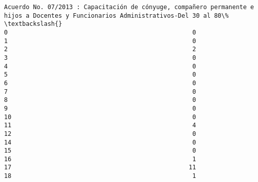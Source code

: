 \documentclass[11pt]{article}
\begin{document}
\begin{Verbatim}[commandchars=\\\{\}]
    Acuerdo No. 07/2013 : Capacitación de cónyuge, compañero permanente e hijos a Docentes y Funcionarios Administrativos-Del 30 al 80\%   \textbackslash{}
0                                                   0                                                                                      
1                                                   0                                                                                      
2                                                   2                                                                                      
3                                                   0                                                                                      
4                                                   0                                                                                      
5                                                   0                                                                                      
6                                                   0                                                                                      
7                                                   0                                                                                      
8                                                   0                                                                                      
9                                                   0                                                                                      
10                                                  0                                                                                      
11                                                  4                                                                                      
12                                                  0                                                                                      
14                                                  0                                                                                      
15                                                  0                                                                                      
16                                                  1                                                                                      
17                                                 11                                                                                      
18                                                  1                                                                                      

\end{Verbatim}
\end{document}
